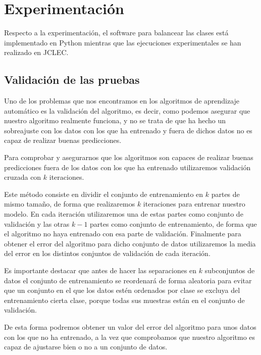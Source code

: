 \section{Experimentación}

Respecto a la experimentación, el software para balancear las clases está implementado en Python mientras que las ejecuciones experimentales se han realizado en JCLEC.



\newpage

\subsection{Validación de las pruebas}


Uno de los problemas que nos encontramos en los algoritmos de aprendizaje automático es la validación del algoritmo, es decir, como podemos asegurar que nuestro algoritmo realmente funciona, y no se trata de que ha hecho un sobreajuste con los datos con los que ha entrenado y fuera de dichos datos no es capaz de realizar buenas predicciones.

Para comprobar y asegurarnos que los algoritmos son capaces de realizar buenas predicciones fuera de los datos con los que ha entrenado utilizaremos validación cruzada con $k$ iteraciones.

Este método consiste en dividir el conjunto de entrenamiento en $k$ partes de mismo tamaño, de forma que realizaremos $k$ iteraciones para entrenar nuestro modelo. En cada iteración utilizaremos una de estas partes como conjunto de validación y las otras $k - 1$ partes como conjunto de entrenamiento, de forma que el algoritmo no haya entrenado con esa parte de validación. Finalmente para obtener el error del algoritmo para dicho conjunto de datos utilizaremos la media del error en los distintos conjuntos de validación de cada iteración.

Es importante destacar que antes de hacer las separaciones en $k$ subconjuntos de datos el conjunto de entrenamiento se reordenará de forma aleatoria para evitar que un conjunto en el que los datos estén ordenados por clase se excluya del entrenamiento cierta clase, porque todas sus muestras están en el conjunto de validación.

De esta forma podremos obtener un valor del error del algoritmo para unos datos con los que no ha entrenado, a la vez que comprobamos que nuestro algoritmo es capaz de ajustarse bien o no a un conjunto de datos.


